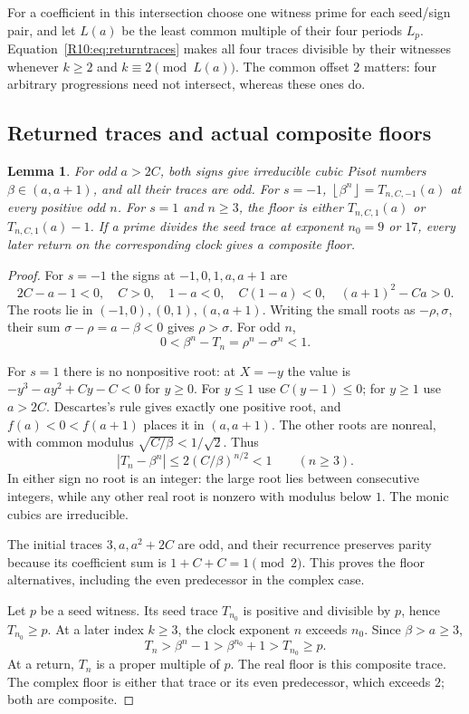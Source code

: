 \documentclass[11pt,a4paper]{article}
\newtheorem{lemma}[theorem]{Lemma}\newtheorem{proposition}[theorem]{Proposition}
\theoremstyle{definition}\newtheorem{definition}[theorem]{Definition}
\theoremstyle{remark}\newtheorem{remark}[theorem]{Remark}
\newcommand{\floor}[1]{\left\lfloor#1\right\rfloor}
\begin{document}
For a coefficient in this intersection choose one witness prime for
each seed/sign pair, and let $L(a)$ be the least common multiple of
their four periods $L_p$.
Equation~\eqref{R10:eq:returntraces} makes all four traces divisible by their
witnesses whenever $k\ge2$ and $k\equiv2\pmod{L(a)}$.
The common offset $2$ matters: four arbitrary progressions need not
intersect, whereas these ones do.

\subsection{Returned traces and actual composite floors}\label{R10:sec:floors}

\begin{lemma}\label{R10:lem:floor}
For odd $a>2C$, both signs give irreducible cubic Pisot numbers
$\beta\in(a,a+1)$, and all their traces are odd.
For $s=-1$, $\floor{\beta^n}=T_{n,C,-1}(a)$ at every positive odd $n$.
For $s=1$ and $n\ge3$, the floor is either $T_{n,C,1}(a)$ or
$T_{n,C,1}(a)-1$.
If a prime divides the seed trace at exponent $n_0=9$ or $17$, every
later return on the corresponding clock gives a composite floor.
\end{lemma}
\begin{proof}
For $s=-1$ the signs at $-1,0,1,a,a+1$ are
\[
 2C-a-1<0,\quad C>0,\quad1-a<0,\quad C(1-a)<0,\quad(a+1)^2-Ca>0.
\]
The roots lie in $(-1,0),(0,1),(a,a+1)$.
Writing the small roots as $-\rho,\sigma$,
their sum $\sigma-\rho=a-\beta<0$ gives $\rho>\sigma$.
For odd $n$,
\[
                         0<\beta^n-T_n=\rho^n-\sigma^n<1.
\]

For $s=1$ there is no nonpositive root: at $X=-y$ the value is
$-y^3-ay^2+Cy-C<0$ for $y\ge0$.
For $y\le1$ use $C(y-1)\le0$; for $y\ge1$ use $a>2C$.
Descartes's rule gives exactly one positive root, and
$f(a)<0<f(a+1)$ places it in $(a,a+1)$.
The other roots are nonreal, with common modulus
$\sqrt{C/\beta}<1/\sqrt2$. Thus
\[
                        |T_n-\beta^n|\le2(C/\beta)^{n/2}<1
                                      \qquad(n\ge3).
\]
In either sign no root is an integer: the large root lies between
consecutive integers, while any other real root is nonzero with modulus
below $1$. The monic cubics are irreducible.

The initial traces $3,a,a^2+2C$ are odd, and their recurrence preserves
parity because its coefficient sum is $1+C+C=1\pmod2$.
This proves the floor alternatives, including the even predecessor
in the complex case.

Let $p$ be a seed witness. Its seed trace $T_{n_0}$ is positive and
divisible by $p$, hence $T_{n_0}\ge p$.
At a later index $k\ge3$, the clock exponent $n$ exceeds $n_0$.
Since $\beta>a\ge3$,
\[
                     T_n>\beta^n-1>\beta^{n_0}+1>T_{n_0}\ge p.
\]
At a return, $T_n$ is a proper multiple of $p$.
The real floor is this composite trace.
The complex floor is either that trace or its even predecessor,
which exceeds $2$; both are composite.
\end{proof}
\end{document}
